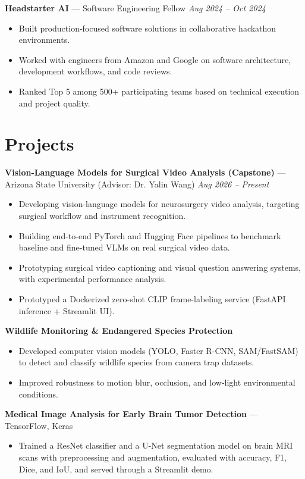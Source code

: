 \documentclass[a4paper,8pt]{extarticle}
\begin{document}
\noindent
\textbf{Headstarter AI} --- Software Engineering Fellow
\hfill \textit{Aug 2024 -- Oct 2024}

\begin{itemize}
\item Built production-focused software solutions in collaborative hackathon environments.
\item Worked with engineers from Amazon and Google on software architecture, development workflows, and code reviews.
\item Ranked Top 5 among 500+ participating teams based on technical execution and project quality.
\end{itemize}

\section*{Projects}

\noindent
\textbf{Vision-Language Models for Surgical Video Analysis (Capstone)} --- Arizona State University (Advisor: Dr. Yalin Wang)
\hfill \textit{Aug 2026 -- Present}

\begin{itemize}
\item Developing vision-language models for neurosurgery video analysis, targeting surgical workflow and instrument recognition.
\item Building end-to-end PyTorch and Hugging Face pipelines to benchmark baseline and fine-tuned VLMs on real surgical video data.
\item Prototyping surgical video captioning and visual question answering systems, with experimental performance analysis.
\item Prototyped a Dockerized zero-shot CLIP frame-labeling service (FastAPI inference + Streamlit UI).
\end{itemize}

\noindent
\textbf{Wildlife Monitoring \& Endangered Species Protection}

\begin{itemize}
\item Developed computer vision models (YOLO, Faster R-CNN, SAM/FastSAM) to detect and classify wildlife species from camera trap datasets.
\item Improved robustness to motion blur, occlusion, and low-light environmental conditions.
\end{itemize}

\noindent
\textbf{Medical Image Analysis for Early Brain Tumor Detection} --- TensorFlow, Keras

\begin{itemize}
\item Trained a ResNet classifier and a U-Net segmentation model on brain MRI scans with preprocessing and augmentation, evaluated with accuracy, F1, Dice, and IoU, and served through a Streamlit demo.
\end{itemize}
\end{document}
